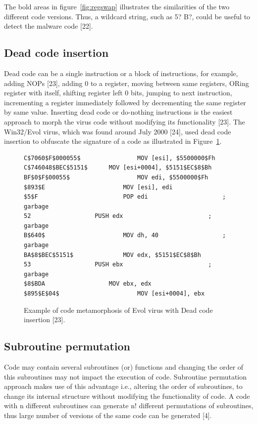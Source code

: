 The bold areas in figure~\ref{fig:regswap} illustrates the similarities of the two different code versions. Thus, a wildcard string, such as 5? B?, could be useful to detect the malware code [22]. 

\subsection{Dead code insertion} 

Dead code can be a single instruction or a block of instructions, for example, adding NOPs [23], adding 0 to a register, moving between same registers, ORing register with itself, shifting register left 0 bits, jumping to next instruction, incrementing a register immediately followed by decrementing the same register by same value. Inserting dead code or do-nothing instructions is the easiest approach to morph the virus code without modifying its functionality [23]. 
The Win32/Evol virus, which was found around July 2000 [24], used dead code insertion to obfuscate the signature of a code as illustrated in Figure~\ref{fig:deadcode}. 

\begin{figure}
  \centering
  \begin{lstlisting}[language=myasm]
C$7060$F$000055$				MOV [esi], $5500000$Fh
C$746048$BEC$5151$		MOV [esi+0004], $5151$EC$8$Bh
BF$0$F$00055$					MOV edi, $5500000$Fh
$893$E 						MOV [esi], edi
$5$F 						POP edi						; garbage
52 					PUSH edx						; garbage
B$640$ 						MOV dh, 40 					; garbage
BA$8$BEC$5151$ 				MOV edx, $5151$EC$8$Bh
53 					PUSH ebx						; garbage
$8$BDA					MOV ebx, edx
$895$E$04$						MOV [esi+0004], ebx  
\end{lstlisting}
    \caption[Example of code metamorphosis of Evol virus ]{Example of code metamorphosis of Evol virus with Dead code insertion [23].}
    \label{fig:deadcode}
\end{figure}

\subsection{Subroutine permutation} 

Code may contain several subroutines (or) functions and changing the order of this subroutines may not impact the execution of code. Subroutine permutation approach makes use of this advantage i.e., altering the order of subroutines, to change its internal structure without modifying the functionality of code. A code with n different subroutines can generate n! different permutations of subroutines, thus large number of versions of the same code can be generated [4].

